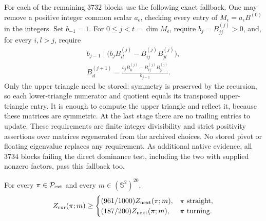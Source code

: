 For each of the remaining \(3732\) blocks use the following exact
fallback. One may remove a positive integer common scalar
\(a_\epsilon\), checking every entry of
\(M_\epsilon=a_\epsilon B^{(0)}\) in the integers.
Set \(b_{-1}=1\). For \(0\le j<t=\dim M_\epsilon\), require
\(b_j=B^{(j)}_{jj}>0\), and, for every \(i,l>j\), require
\[
 \begin{gathered}
 b_{j-1}\mid
   \bigl(b_jB^{(j)}_{il}-B^{(j)}_{ij}B^{(j)}_{jl}\bigr),\\
 B^{(j+1)}_{il}
   =\frac{b_jB^{(j)}_{il}-B^{(j)}_{ij}B^{(j)}_{jl}}{b_{j-1}}.
 \end{gathered}
\]
Only the upper triangle need be stored: symmetry is preserved by
the recursion, so each lower-triangle numerator and quotient equals
its transposed upper-triangle entry.
It is enough to compute the upper triangle and reflect it, because
these matrices are symmetric. At the last stage there are no
trailing entries to update. These requirements are finite integer
divisibility and strict positivity assertions over matrices
regenerated from the archived choices. No stored pivot or floating
eigenvalue replaces any requirement. As additional native evidence,
all \(3734\) blocks failing the direct dominance test, including
the two with supplied nonzero factors, pass this fallback too.

\begin{theorem}\label{t:H1}
For every \(\pi\in\mathcal P_{\rm ext}\) and every
\(m\in(\mathbb S^2)^{20}\),
\[
 Z_{\rm cur}(\pi;m)\ge
 \begin{cases}
 (961/1000)Z_{\rm next}(\pi;m),&\pi\text{ straight},\\
 (187/200)Z_{\rm next}(\pi;m),&\pi\text{ turning}.
 \end{cases}
\]
\end{theorem}

